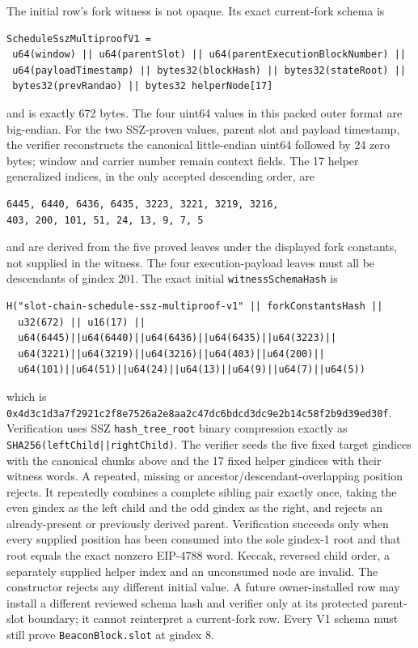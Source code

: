 \documentclass[a4paper,11pt]{article}
\newcommand{\code}[1]{\nolinkurl{#1}}
\begin{document}
The initial row's fork witness is not opaque.  Its exact current-fork schema is
\begin{verbatim}
ScheduleSszMultiproofV1 =
 u64(window) || u64(parentSlot) || u64(parentExecutionBlockNumber) ||
 u64(payloadTimestamp) || bytes32(blockHash) || bytes32(stateRoot) ||
 bytes32(prevRandao) || bytes32 helperNode[17]
\end{verbatim}
and is exactly 672 bytes.  The four uint64 values in this packed outer format
are big-endian.  For the two SSZ-proven values, parent slot and payload
timestamp, the verifier reconstructs the canonical little-endian uint64
followed by 24 zero bytes; window and carrier number remain context fields.
The 17 helper generalized
indices, in the only accepted descending order, are
\begin{verbatim}
6445, 6440, 6436, 6435, 3223, 3221, 3219, 3216,
403, 200, 101, 51, 24, 13, 9, 7, 5
\end{verbatim}
and are derived from the five proved leaves under the displayed fork constants,
not supplied in the witness.  The four execution-payload leaves must all be
descendants of gindex 201.  The exact initial
\code{witnessSchemaHash} is
\begin{verbatim}
H("slot-chain-schedule-ssz-multiproof-v1" || forkConstantsHash ||
  u32(672) || u16(17) ||
  u64(6445)||u64(6440)||u64(6436)||u64(6435)||u64(3223)||
  u64(3221)||u64(3219)||u64(3216)||u64(403)||u64(200)||
  u64(101)||u64(51)||u64(24)||u64(13)||u64(9)||u64(7)||u64(5))
\end{verbatim}
which is
\code{0x4d3c1d3a7f2921c2f8e7526a2e8aa2c47dc6bdcd3dc9e2b14c58f2b9d39ed30f}.
Verification uses SSZ \code{hash_tree_root} binary compression exactly as
\code{SHA256(leftChild||rightChild)}.  The verifier seeds the five fixed target
gindices with the canonical chunks above and the 17 fixed helper gindices with
their witness words.  A repeated, missing or ancestor/descendant-overlapping
position rejects.  It repeatedly combines a complete sibling pair exactly
once, taking the even gindex as the left child and the odd gindex as the right,
and rejects an already-present or previously derived parent.  Verification
succeeds only when every supplied position has been consumed into the sole
gindex-1 root and that root equals the exact nonzero EIP-4788 word.  Keccak,
reversed child order, a separately supplied helper index and an unconsumed
node are invalid.
The constructor rejects any different initial value.  A future owner-installed
row may install a different reviewed schema hash and verifier only at its protected
parent-slot boundary; it cannot reinterpret a current-fork row.  Every V1
schema must still prove \code{BeaconBlock.slot} at gindex 8.
\end{document}
